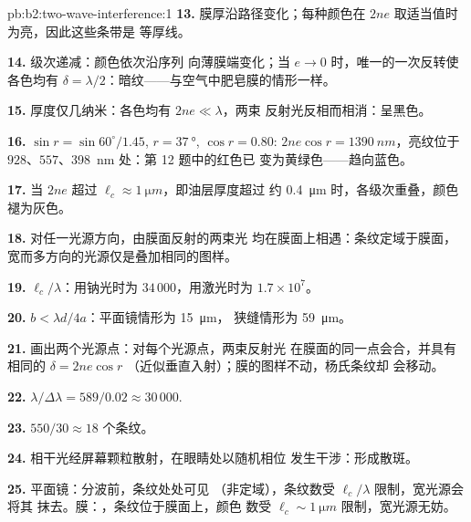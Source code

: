 \begin{solution}{pb:b2:two-wave-interference:1}
\textbf{13.} 膜厚沿路径变化；每种颜色在 $2ne$ 取适当值时
为亮，因此这些条带是
等厚线。

\textbf{14.} 级次递减：颜色依次沿序列
向薄膜端变化；当 $e \to 0$ 时，唯一的一次反转使
各色均有 $\delta = \lambda/2$：暗纹——与空气中肥皂膜的情形一样。

\textbf{15.} 厚度仅几纳米：各色均有 $2ne \ll \lambda$，两束
反射光反相而相消：呈黑色。

\textbf{16.} $\sin r = \sin60^\circ/1.45$, $r = \qty{37}{\degree}$, $\cos r = 0.80$: $2ne\cos r
= \qty{1390}{nm}$，亮纹位于 $928$、$557$、\qty{398}{nm} 处：第 12 题中的红色已
变为黄绿色——趋向蓝色。

\textbf{17.} 当 $2ne$ 超过 $\ell_c \approx \qty{1}{\micro m}$，即油层厚度超过
约 \qty{0.4}{\micro m} 时，各级次重叠，颜色褪为灰色。

\textbf{18.} 对任一光源方向，由膜面反射的两束光
均在膜面上相遇：条纹定域于膜面，
宽而多方向的光源仅是叠加相同的图样。

\textbf{19.} $\ell_c/\lambda$：用钠光时为 $34\,000$，用激光时为 $1.7 \times 10^7$。

\textbf{20.} $b < \lambda d/4a$：平面镜情形为 \qty{15}{\micro m}，
狭缝情形为 \qty{59}{\micro m}。

\textbf{21.} 画出两个光源点：对每个光源点，两束反射光
在膜面的同一点会合，并具有相同的 $\delta = 2ne\cos r$
（近似垂直入射）；膜的图样不动，杨氏条纹却
会移动。

\textbf{22.} $\lambda/\Delta\lambda = 589/0.02 \approx 30\,000$.

\textbf{23.} $550/30 \approx 18$ 个条纹。

\textbf{24.} 相干光经屏幕颗粒散射，在眼睛处以随机相位
发生干涉：形成散斑。

\textbf{25.} 平面镜：分波前，条纹处处可见
（非定域），条纹数受 $\ell_c/\lambda$ 限制，宽光源会将其
抹去。膜：，条纹位于膜面上，颜色
数受 $\ell_c \sim \qty{1}{\micro m}$ 限制，宽光源无妨。
\end{solution}
